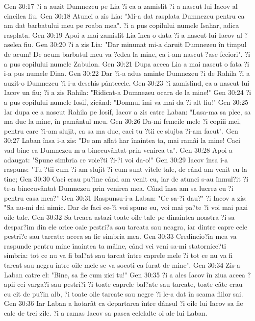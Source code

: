 Gen 30:17  ?i a auzit Dumnezeu pe Lia ?i ea a zamislit ?i a nascut lui Iacov al cincilea fiu.
Gen 30:18  Atunci a zis Lia: "Mi-a dat rasplata Dumnezeu pentru ca am dat barbatului meu pe roaba mea". ?i a pus copilului numele Isahar, adica rasplata.
Gen 30:19  Apoi a mai zamislit Lia înca o data ?i a nascut lui Iacov al ?aselea fiu.
Gen 30:20  ?i a zis Lia: "Dar minunat mi-a daruit Dumnezeu în timpul de acum! De acum barbatul meu va ?edea la mine, ca i-am nascut ?ase feciori". ?i a pus copilului numele Zabulon.
Gen 30:21  Dupa aceea Lia a mai nascut o fata ?i i-a pus numele Dina.
Gen 30:22  Dar ?i-a adus aminte Dumnezeu ?i de Rahila ?i a auzit-o Dumnezeu ?i i-a deschis pântecele.
Gen 30:23  ?i zamislind, ea a nascut lui Iacov un fiu; ?i a zis Rahila: "Ridicat-a Dumnezeu ocara de la mine!"
Gen 30:24  ?i a pus copilului numele Iosif, zicând: "Domnul îmi va mai da ?i alt fiu!"
Gen 30:25  Iar dupa ce a nascut Rahila pe Iosif, Iacov a zis catre Laban: "Lasa-ma sa plec, sa ma duc la mine, în pamântul meu.
Gen 30:26  Da-mi femeile mele ?i copiii mei, pentru care ?i-am slujit, ca sa ma duc, caci tu ?tii ce slujba ?i-am facut".
Gen 30:27  Laban însa i-a zis: "De am aflat har înaintea ta, mai ramâi la mine! Caci vad bine ca Dumnezeu m-a binecuvântat prin venirea ta".
Gen 30:28  Apoi a adaugat: "Spune simbria ce voie?ti ?i-?i voi da-o!"
Gen 30:29  Iacov însa i-a raspuns: "Tu ?tii cum ?i-am slujit ?i cum sunt vitele tale, de când am venit eu la tine;
Gen 30:30  Caci erau pu?ine când am venit eu, iar de atunci s-au înmul?it ?i te-a binecuvântat Dumnezeu prin venirea mea. Când însa am sa lucrez eu ?i pentru casa mea?"
Gen 30:31  Raspunsu-i-a Laban: "Ce sa-?i dau?" ?i Iacov a zis: "Sa nu-mi dai nimic. Dar de faci ce-?i voi spune eu, voi mai pa?te ?i voi mai pazi oile tale.
Gen 30:32  Sa treaca astazi toate oile tale pe dinaintea noastra ?i sa despar?im din ele orice oaie pestri?a sau tarcata sau neagra, iar dintre capre cele pestri?e sau tarcate: aceea sa fie simbria mea.
Gen 30:33  Credincio?ia mea va raspunde pentru mine înaintea ta mâine, când vei veni sa-mi statornice?ti simbria: tot ce nu va fi bal?at sau tarcat între caprele mele ?i tot ce nu va fi tarcat sau negru între oile mele se va socoti ca furat de mine".
Gen 30:34  Zis-a Laban catre el: "Bine, sa fie cum zici tu!"
Gen 30:35  ?i a ales Iacov în ziua aceea ?apii cei varga?i sau pestri?i ?i toate caprele bal?ate sau tarcate, toate câte erau cu cit de pu?in alb, ?i toate oile tarcate sau negre ?i le-a dat în seama fiilor sai.
Gen 30:36  Iar Laban a hotarât ca departarea între dânsul ?i oile lui Iacov sa fie cale de trei zile. ?i a ramas Iacov sa pasca celelalte oi ale lui Laban.

